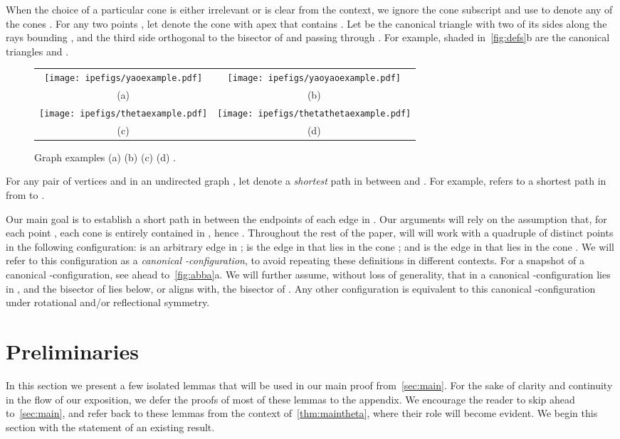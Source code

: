 \documentclass[runningheads,a4paper]{llncs}
\begin{document}
When the choice of a particular cone is either irrelevant or is clear from the context, we ignore the cone subscript and use  to denote any of the cones .  For any two points , let  denote the cone with apex  that contains .  Let  be the canonical triangle with two of its sides along the rays bounding , and the third side orthogonal to the bisector of 
 and passing through . For example, shaded in~\autoref{fig:defs}b are the canonical triangles  and . 

\begin{figure}[htbp]
\centering
\begin{tabular}{c@{\hspace{0.1\linewidth}}c}
\texttt{[image: ipefigs/yaoexample.pdf]} & 
\texttt{[image: ipefigs/yaoyaoexample.pdf]} \\
(a) & (b) \\
\texttt{[image: ipefigs/thetaexample.pdf]} & 
\texttt{[image: ipefigs/thetathetaexample.pdf]} \\
(c) & (d) 
\end{tabular}
\caption{Graph examples (a)  (b)  (c)  (d) .}
\label{fig:yaothetaex}
\end{figure}


For any pair of vertices  and  in an undirected graph , let  denote a \emph{shortest} path in  between  and . 
For example,  refers to a shortest path in  from  to . 


Our main goal is to establish a short path in  between the endpoints of each edge in . Our arguments will rely on the assumption that, for each point , each cone  is entirely contained in , hence . 
Throughout the rest of the paper, will will work with a quadruple of distinct points  in the following configuration:  is an arbitrary edge in ;  is the edge in  that lies in the cone ; and  is the edge in  that lies in the cone . We will refer to this configuration as a \emph{canonical -configuration}, to avoid repeating these definitions in different contexts.
For a snapshot of a canonical -configuration, see ahead to~\autoref{fig:abba}a. 
We will further assume, without loss of generality, that in a canonical -configuration  lies in , and the bisector of  lies below, or aligns with, the bisector of . Any other configuration is equivalent to this canonical -configuration under rotational and/or reflectional symmetry.  

\section{Preliminaries}
\label{sec:basic}
In this section we present a few isolated lemmas that will be used in our main proof from~\autoref{sec:main}. 
For the sake of clarity and continuity in the flow of our exposition, we defer the proofs of most of these lemmas to the appendix. 
We encourage the reader to skip ahead to~\autoref{sec:main}, and refer back to these lemmas from the context of~\autoref{thm:maintheta}, where their role will become evident.
We begin this section with the statement of an existing result. 
\end{document}
